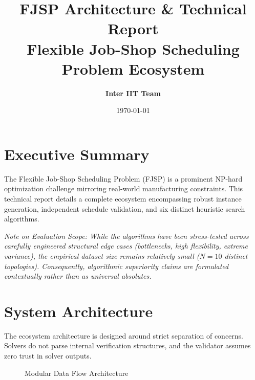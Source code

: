 \documentclass[11pt,a4paper]{article}
\title{\textbf{\Huge FJSP Architecture \& Technical Report}\\ \vspace{0.3cm} \Large Flexible Job-Shop Scheduling Problem Ecosystem}
\author{\textbf{Inter IIT Team}}
\date{\today}
\begin{document}
\maketitle
\tableofcontents
\newpage

\section{Executive Summary}
The Flexible Job-Shop Scheduling Problem (FJSP) is a prominent NP-hard optimization challenge mirroring real-world manufacturing constraints. This technical report details a complete ecosystem encompassing robust instance generation, independent schedule validation, and six distinct heuristic search algorithms.

\textit{Note on Evaluation Scope: While the algorithms have been stress-tested across carefully engineered structural edge cases (bottlenecks, high flexibility, extreme variance), the empirical dataset size remains relatively small ($N=10$ distinct topologies). Consequently, algorithmic superiority claims are formulated contextually rather than as universal absolutes.}

\section{System Architecture}
The ecosystem architecture is designed around strict separation of concerns. Solvers do not parse internal verification structures, and the validator assumes zero trust in solver outputs.

\begin{figure}[H]
    \centering
    \caption{Modular Data Flow Architecture}
    \label{fig:arch}
\end{figure}
\end{document}
